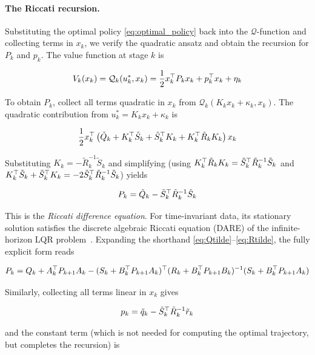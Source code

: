 \paragraph{The Riccati recursion.}
Substituting the optimal policy \eqref{eq:optimal_policy} back into the $\mathcal{Q}$-function and collecting terms in $x_k$, we verify the quadratic ansatz and obtain the recursion for $P_k$ and $p_k$.
The value function at stage $k$ is

\[
V_k(x_k) = \mathcal{Q}_k(u_k^*, x_k) = \frac{1}{2} x_k^\top P_k x_k + p_k^\top x_k + \eta_k
\]

To obtain $P_k$, collect all terms quadratic in $x_k$ from $\mathcal{Q}_k(K_k x_k + \kappa_k, x_k)$.
The quadratic contribution from $u_k^* = K_k x_k + \kappa_k$ is

\begin{equation*}
\frac{1}{2} x_k^\top \left( \tilde{Q}_k + K_k^\top \tilde{S}_k + \tilde{S}_k^\top K_k + K_k^\top \tilde{R}_k K_k \right) x_k
\end{equation*}

Substituting $K_k = -\tilde{R}_k^{-1} \tilde{S}_k$ and simplifying (using $K_k^\top \tilde{R}_k K_k = \tilde{S}_k^\top \tilde{R}_k^{-1} \tilde{S}_k$ and $K_k^\top \tilde{S}_k + \tilde{S}_k^\top K_k = -2 \tilde{S}_k^\top \tilde{R}_k^{-1} \tilde{S}_k$) yields

\begin{equation} \label{eq:riccati_P}
P_k = \tilde{Q}_k - \tilde{S}_k^\top \tilde{R}_k^{-1} \tilde{S}_k
\end{equation}

This is the \textit{Riccati difference equation}.
For time-invariant data, its stationary solution satisfies the discrete algebraic Riccati equation (DARE) of the infinite-horizon LQR problem~\cite{bertsekas1995dynamic}.
Expanding the shorthand \eqref{eq:Qtilde}--\eqref{eq:Rtilde}, the fully explicit form reads

\[
P_k = Q_k + A_k^\top P_{k+1} A_k - (S_k + B_k^\top P_{k+1} A_k)^\top(R_k + B_k^\top P_{k+1} B_k)^{-1}(S_k + B_k^\top P_{k+1} A_k)
\]

Similarly, collecting all terms linear in $x_k$ gives

\begin{equation} \label{eq:riccati_p}
p_k = \tilde{q}_k - \tilde{S}_k^\top \tilde{R}_k^{-1} \tilde{r}_k
\end{equation}

and the constant term (which is not needed for computing the optimal trajectory, but completes the recursion) is

